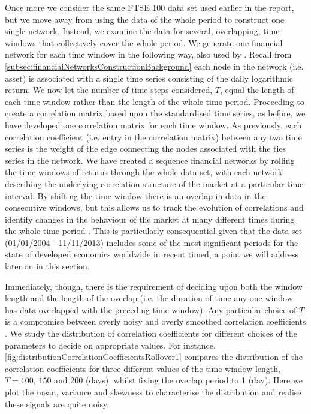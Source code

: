 Once more we consider the same FTSE 100 data set used earlier in the report, but we move away from using the data of the whole period to construct one single network.
Instead, we examine the data for several, overlapping, time windows that collectively cover the whole period.
We generate one financial network for each time window in the following way, also used by \cite{OCK+02,OKK03,BD10,FPM+10,FPW+11}.
Recall from \cref{subsec:financialNetworksConstructionBackground} each node in the network (i.e. asset) is associated with a single time series consisting of the daily logarithmic return.
We now let the number of time steps considered, $T$, equal the length of each time window rather than the length of the whole time period.
Proceeding to create a correlation matrix based upon the standardised time series, as before, we have developed one correlation matrix for each time window.
As previously, each correlation coefficient (i.e. entry in the correlation matrix) between any two time series is the weight of the edge connecting the nodes associated with the ties series in the network.
We have created a sequence financial networks by rolling the time windows of returns through the whole data set, with each network describing the underlying correlation structure of the market at a particular time interval.
By shifting the time window there is an overlap in data in the consecutive windows, but this allows us to track the evolution of correlations and identify changes in the behaviour of the market at many different times during the whole time period \cite{FPW+11}.
This is particularly consequential given that the data set (01/01/2004 - 11/11/2013) includes some of the most significant periods for the state of developed economics worldwide in recent timed, a point we will address later on in this section.

Immediately, though, there is the requirement of deciding upon both the window length and the length of the overlap (i.e. the duration of time any one window has data overlapped with the preceding time window).
Any particular choice of $T$ is a compromise between overly noisy and overly smoothed correlation coefficients \cite{OCK+02,FPW+11}.
We study the distribution of correlation coefficients for different choices of the parameters to decide on appropriate values.
For instance, \cref{fig:distributionCorrelationCoefficientsRollover1} compares the distribution of the correlation coefficients for three different values of the time window length, $T=100$, $150$ and $200$ (days), whilst fixing the overlap period to 1 (day).
Here we plot the mean, variance and skewness to characterise the distribution and realise these signals are quite noisy.

